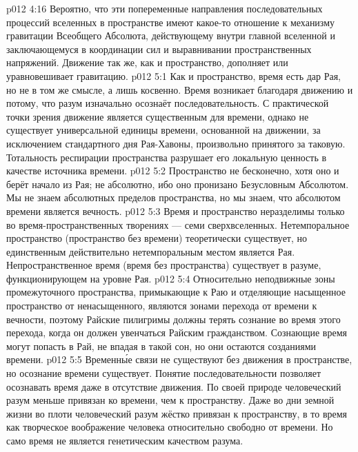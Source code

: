 \vs p012 4:16 Вероятно, что эти попеременные направления последовательных процессий вселенных в пространстве имеют какое\hyp{}то отношение к механизму гравитации Всеобщего Абсолюта, действующему внутри главной вселенной и заключающемуся в координации сил и выравнивании пространственных напряжений. Движение так же, как и пространство, дополняет или уравновешивает гравитацию.
\vs p012 5:1 Как и пространство, время есть дар Рая, но не в том же смысле, а лишь косвенно. Время возникает благодаря движению и потому, что разум изначально осознаёт последовательность. С практической точки зрения движение является существенным для времени, однако не существует универсальной единицы времени, основанной на движении, за исключением стандартного дня Рая\hyp{}Хавоны, произвольно принятого за таковую. Тотальность респирации пространства разрушает его локальную ценность в качестве источника времени.
\vs p012 5:2 Пространство не бесконечно, хотя оно и берёт начало из Рая; не абсолютно, ибо оно пронизано Безусловным Абсолютом. Мы не знаем абсолютных пределов пространства, но мы знаем, что абсолютом времени является вечность.
\vs p012 5:3 \pc Время и пространство неразделимы только во время\hyp{}пространственных творениях --- семи сверхвселенных. Нетемпоральное пространство (пространство без времени) теоретически существует, но единственным действительно нетемпоральным местом является  Рая. Непространственное время (время без пространства) существует в разуме, функционирующем на уровне Рая.
\vs p012 5:4 Относительно неподвижные зоны промежуточного пространства, примыкающие к Раю и отделяющие насыщенное пространство от ненасыщенного, являются зонами перехода от времени к вечности, поэтому Райские пилигримы должны терять сознание во время этого перехода, когда он должен увенчаться Райским гражданством. Сознающие время  могут попасть в Рай, не впадая в такой сон, но они остаются созданиями времени.
\vs p012 5:5 \pc Временн\'ые связи не существуют без движения в пространстве, но осознание времени существует. Понятие последовательности позволяет осознавать время даже в отсутствие движения. По своей природе человеческий разум меньше привязан ко времени, чем к пространству. Даже во дни земной жизни во плоти человеческий разум жёстко привязан к пространству, в то время как творческое воображение человека относительно свободно от времени. Но само время не является генетическим качеством разума.
